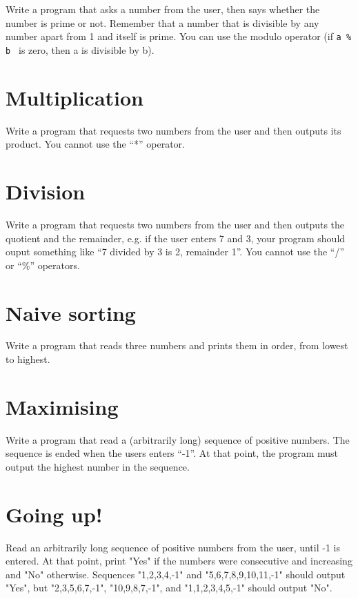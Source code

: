 \documentclass{article}
\begin{document}
Write a program that asks a number from the user, then says whether
the number is prime or not. Remember that a number that is divisible
by any number apart from 1 and itself is prime. You can use the modulo
operator (if \verb+a % b + is zero, then a is divisible by b).

\section{Multiplication}
\label{sec:multiplication}

Write a program that requests two numbers from the user and then
outputs its product. You cannot use the ``*'' operator. 

\section{Division}
\label{sec:division}

Write a program that requests two numbers from the user and then
outputs the quotient and the remainder, e.g. if the user enters 7 and
3, your program should ouput something like ``7 divided by 3 is 2,
remainder 1''. You cannot use the ``/'' or ``\%'' operators. 

\section{Naive sorting}
\label{sec:naive-sorting}

Write a program that reads three numbers and prints them in order, from
lowest to highest. 

\section{Maximising}
\label{sec:maximising}

Write a program that read a (arbitrarily long) sequence of positive
numbers. The sequence is ended when the users enters ``-1''. At that
point, the program must output the highest number in the sequence. 

\section{Going up!}
\label{sec:going-up}

Read an arbitrarily long sequence of positive numbers from the user,
until -1 is entered. At that point, print "Yes" if the numbers were
consecutive and increasing and "No" otherwise. Sequences "1,2,3,4,-1"
and "5,6,7,8,9,10,11,-1" should output "Yes", but "2,3,5,6,7,-1",
"10,9,8,7,-1", and "1,1,2,3,4,5,-1" should output "No".
\end{document}
